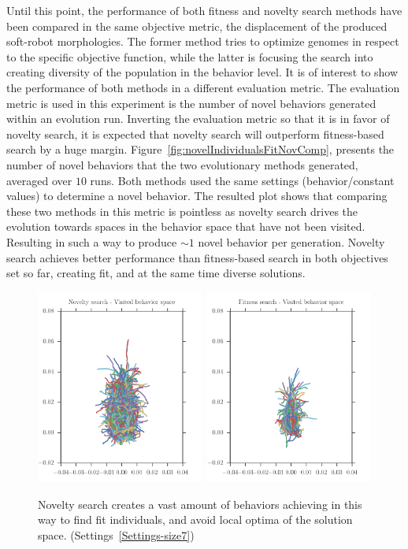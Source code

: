 Until this point, the performance of both fitness and novelty search methods have been compared in the same objective metric, the displacement of the produced soft-robot morphologies. The former method tries to optimize genomes in respect to the specific objective function, while the latter is focusing the search into creating diversity of the population in the behavior level. It is of interest to show the performance of both methods in a different evaluation metric. The evaluation metric is used in this experiment is the number of novel behaviors generated within an evolution run. Inverting the evaluation metric so that it is in favor of novelty search, it is expected that novelty search will outperform fitness-based search by a huge margin. Figure~\ref{fig:novelIndividualsFitNovComp}, presents the number of novel behaviors that the two evolutionary methods generated, averaged over $10$ runs. Both methods used the same settings (behavior/constant values) to determine a novel behavior. The resulted plot shows that comparing these two methods in this metric is pointless as novelty search drives the evolution towards spaces in the behavior space that have not been visited. Resulting in such a way to produce $\sim 1$ novel behavior per generation. Novelty search achieves better performance than fitness-based search in both objectives set so far, creating fit, and at the same time diverse solutions.
\begin{figure}[t!]
\centering
\includegraphics[width=0.49\textwidth]{../Figures/Behaviors/behaviorsNovelty.pdf}\	
\includegraphics[width=0.49\textwidth]{../Figures/Behaviors/behaviorsFitness.pdf}
\caption{Novelty search creates a vast amount of behaviors achieving in this way to find fit individuals, and avoid local optima of the solution space. (Settings~\ref{Settings-size7})}
\label{fig:behaviorSpaceDiversity}
\end{figure}
